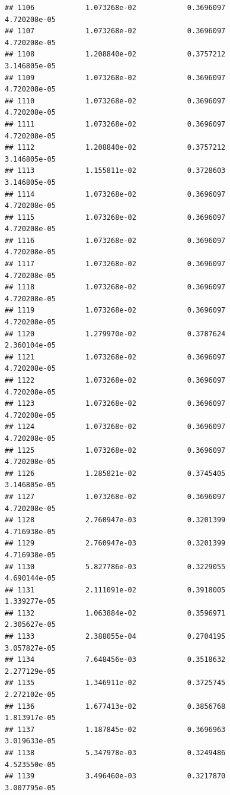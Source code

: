 \documentclass[
]{article}
\begin{document}
\begin{verbatim}
## 1106            1.073268e-02            0.3696097            4.720208e-05
## 1107            1.073268e-02            0.3696097            4.720208e-05
## 1108            1.208840e-02            0.3757212            3.146805e-05
## 1109            1.073268e-02            0.3696097            4.720208e-05
## 1110            1.073268e-02            0.3696097            4.720208e-05
## 1111            1.073268e-02            0.3696097            4.720208e-05
## 1112            1.208840e-02            0.3757212            3.146805e-05
## 1113            1.155811e-02            0.3728603            3.146805e-05
## 1114            1.073268e-02            0.3696097            4.720208e-05
## 1115            1.073268e-02            0.3696097            4.720208e-05
## 1116            1.073268e-02            0.3696097            4.720208e-05
## 1117            1.073268e-02            0.3696097            4.720208e-05
## 1118            1.073268e-02            0.3696097            4.720208e-05
## 1119            1.073268e-02            0.3696097            4.720208e-05
## 1120            1.279970e-02            0.3787624            2.360104e-05
## 1121            1.073268e-02            0.3696097            4.720208e-05
## 1122            1.073268e-02            0.3696097            4.720208e-05
## 1123            1.073268e-02            0.3696097            4.720208e-05
## 1124            1.073268e-02            0.3696097            4.720208e-05
## 1125            1.073268e-02            0.3696097            4.720208e-05
## 1126            1.285821e-02            0.3745405            3.146805e-05
## 1127            1.073268e-02            0.3696097            4.720208e-05
## 1128            2.760947e-03            0.3201399            4.716938e-05
## 1129            2.760947e-03            0.3201399            4.716938e-05
## 1130            5.827786e-03            0.3229055            4.690144e-05
## 1131            2.111091e-02            0.3918005            1.339277e-05
## 1132            1.063884e-02            0.3596971            2.305627e-05
## 1133            2.388055e-04            0.2704195            3.057827e-05
## 1134            7.648456e-03            0.3518632            2.277129e-05
## 1135            1.346911e-02            0.3725745            2.272102e-05
## 1136            1.677413e-02            0.3856768            1.813917e-05
## 1137            1.187845e-02            0.3696963            3.019633e-05
## 1138            5.347978e-03            0.3249486            4.523550e-05
## 1139            3.496460e-03            0.3217870            3.007795e-05

\end{verbatim}
\end{document}

